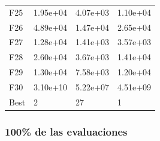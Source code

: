 \begin{table}[H]
\begin{minipage}{.5\linewidth}
\begin{tabular}{llll}
        F25  &   1.95e+04 &   4.07e+03 &  1.10e+04 \\
        F26  &   4.89e+04 &   1.47e+04 &  2.65e+04 \\
        F27  &   1.28e+04 &   1.41e+03 &  3.57e+03 \\
        F28  &   2.60e+04 &   3.67e+03 &  1.41e+04 \\
        F29  &   1.30e+04 &   7.58e+03 &  1.20e+04 \\
        F30  &   3.10e+10 &   5.22e+07 &  4.51e+09 \\
        Best &          2 &         27 &         1 \\
        \bottomrule
        \end{tabular}
        
    \end{minipage} 
\end{table}


\subsubsection*{100\% de las evaluaciones}

